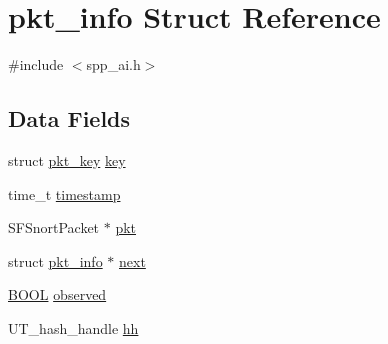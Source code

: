 \hypertarget{structpkt__info}{
\section{pkt\_\-info Struct Reference}
\label{structpkt__info}
}


{\ttfamily \#include $<$spp\_\-ai.h$>$}

\subsection*{Data Fields}
\begin{DoxyCompactItemize}
\item 
struct \hyperlink{structpkt__key}{pkt\_\-key} \hyperlink{structpkt__info_a231d4734d3c62292b06eb9ea4b49c339}{key}
\item 
time\_\-t \hyperlink{structpkt__info_a7f5090443f21e6290f0439f1bb872e92}{timestamp}
\item 
SFSnortPacket $\ast$ \hyperlink{structpkt__info_a8d5ebd04a32067b05387e5c5056fe168}{pkt}
\item 
struct \hyperlink{structpkt__info}{pkt\_\-info} $\ast$ \hyperlink{structpkt__info_a5ee3c51f2ca5768b94819182641ef168}{next}
\item 
\hyperlink{spp__ai_8h_a3e5b8192e7d9ffaf3542f1210aec18dd}{BOOL} \hyperlink{structpkt__info_ac7ff78ea5faf333fc91f92e3085ea7c9}{observed}
\item 
UT\_\-hash\_\-handle \hyperlink{structpkt__info_a264e90d4b5d490de040f38c1072e142f}{hh}
\end{DoxyCompactItemize}


